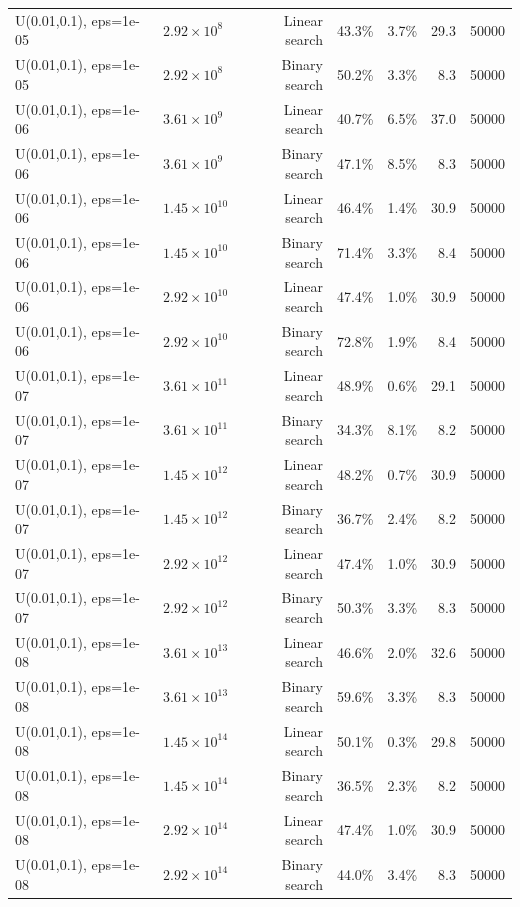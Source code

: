 \begin{tabular}{llrrrrr}
U(0.01,0.1), eps=1e-05 & $2.92\times 10^{8}$ & Linear search & 43.3\% & 3.7\% & 29.3 & 50000 \\
U(0.01,0.1), eps=1e-05 & $2.92\times 10^{8}$ & Binary search & 50.2\% & 3.3\% & 8.3 & 50000 \\
U(0.01,0.1), eps=1e-06 & $3.61\times 10^{9}$ & Linear search & 40.7\% & 6.5\% & 37.0 & 50000 \\
U(0.01,0.1), eps=1e-06 & $3.61\times 10^{9}$ & Binary search & 47.1\% & 8.5\% & 8.3 & 50000 \\
U(0.01,0.1), eps=1e-06 & $1.45\times 10^{10}$ & Linear search & 46.4\% & 1.4\% & 30.9 & 50000 \\
U(0.01,0.1), eps=1e-06 & $1.45\times 10^{10}$ & Binary search & 71.4\% & 3.3\% & 8.4 & 50000 \\
U(0.01,0.1), eps=1e-06 & $2.92\times 10^{10}$ & Linear search & 47.4\% & 1.0\% & 30.9 & 50000 \\
U(0.01,0.1), eps=1e-06 & $2.92\times 10^{10}$ & Binary search & 72.8\% & 1.9\% & 8.4 & 50000 \\
U(0.01,0.1), eps=1e-07 & $3.61\times 10^{11}$ & Linear search & 48.9\% & 0.6\% & 29.1 & 50000 \\
U(0.01,0.1), eps=1e-07 & $3.61\times 10^{11}$ & Binary search & 34.3\% & 8.1\% & 8.2 & 50000 \\
U(0.01,0.1), eps=1e-07 & $1.45\times 10^{12}$ & Linear search & 48.2\% & 0.7\% & 30.9 & 50000 \\
U(0.01,0.1), eps=1e-07 & $1.45\times 10^{12}$ & Binary search & 36.7\% & 2.4\% & 8.2 & 50000 \\
U(0.01,0.1), eps=1e-07 & $2.92\times 10^{12}$ & Linear search & 47.4\% & 1.0\% & 30.9 & 50000 \\
U(0.01,0.1), eps=1e-07 & $2.92\times 10^{12}$ & Binary search & 50.3\% & 3.3\% & 8.3 & 50000 \\
U(0.01,0.1), eps=1e-08 & $3.61\times 10^{13}$ & Linear search & 46.6\% & 2.0\% & 32.6 & 50000 \\
U(0.01,0.1), eps=1e-08 & $3.61\times 10^{13}$ & Binary search & 59.6\% & 3.3\% & 8.3 & 50000 \\
U(0.01,0.1), eps=1e-08 & $1.45\times 10^{14}$ & Linear search & 50.1\% & 0.3\% & 29.8 & 50000 \\
U(0.01,0.1), eps=1e-08 & $1.45\times 10^{14}$ & Binary search & 36.5\% & 2.3\% & 8.2 & 50000 \\
U(0.01,0.1), eps=1e-08 & $2.92\times 10^{14}$ & Linear search & 47.4\% & 1.0\% & 30.9 & 50000 \\
U(0.01,0.1), eps=1e-08 & $2.92\times 10^{14}$ & Binary search & 44.0\% & 3.4\% & 8.3 & 50000 \\

\end{tabular}
